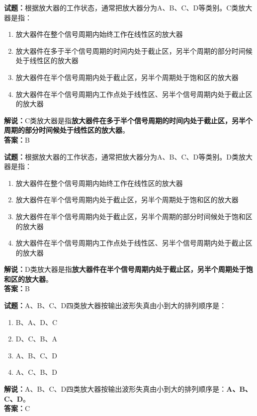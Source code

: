 \documentclass{ctexbook}
\begin{document}
\bigskip


\noindent\textbf{试题：}根据放大器的工作状态，通常把放大器分为A、B、C、D等类别。C类放大器是指：
\begin{enumerate}[leftmargin=3em]
\item 放大器件在整个信号周期内始终工作在线性区的放大器
\item 放大器件在多于半个信号周期的时间内处于截止区，另半个周期的部分时间候处于线性区的放大器
\item 放大器件在半个信号周期内处于截止区，另半个周期处于饱和区的放大器
\item 放大器件在半个信号周期内工作点处于线性区、另半个信号周期内处于截止区的放大器
\end{enumerate}
\noindent\textbf{解说：}C类放大器是指\textbf{放大器件在多于半个信号周期的时间内处于截止区，另半个周期的部分时间候处于线性区的放大器}。\\\noindent\textbf{答案：}B





\bigskip


\noindent\textbf{试题：}根据放大器的工作状态，通常把放大器分为A、B、C、D等类别。D类放大器是指：
\begin{enumerate}[leftmargin=3em]
\item 放大器件在整个信号周期内始终工作在线性区的放大器
\item 放大器件在半个信号周期内处于截止区，另半个周期处于饱和区的放大器
\item 放大器件在半个信号周期内处于截止区，另半个周期的部分时间候处于饱和区的放大器
\item 放大器件在半个信号周期内工作点处于线性区、另半个信号周期内处于截止区的放大器
\end{enumerate}
\noindent\textbf{解说：}D类放大器是指\textbf{放大器件在半个信号周期内处于截止区，另半个周期处于饱和区的放大器}。\\\noindent\textbf{答案：}B





\bigskip


\noindent\textbf{试题：}A、B、C、D四类放大器按输出波形失真由小到大的排列顺序是：
\begin{enumerate}[leftmargin=3em]
\item B、A、D、C
\item D、C、B、A
\item A、B、C、D
\item A、C、B、D
\end{enumerate}
\noindent\textbf{解说：}A、B、C、D四类放大器按输出波形失真由小到大的排列顺序是：\textbf{A、B、C、D}。\\\noindent\textbf{答案：}C
\end{document}
